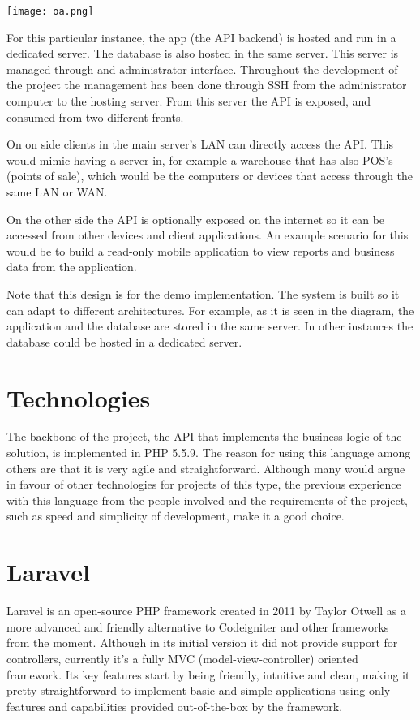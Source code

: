 \texttt{[image: oa.png]}

For this particular instance, the app (the API backend) is hosted and run in a dedicated server. The database is also hosted in the same server. This server is managed through and administrator interface. Throughout the development of the project the management has been done through SSH from the administrator computer to the hosting server. From this server the API is exposed, and consumed from two different fronts. 

On on side clients in the main server’s LAN can directly access the API. This would mimic having a server in, for example a warehouse that has also POS’s (points of sale), which would be the computers or devices that access through the same LAN or WAN.

On the other side the API is optionally exposed on the internet so it can be accessed from other devices and client applications. An example scenario for this would be to build a read-only mobile application to view reports and business data from the application.

Note that this design is for the demo implementation. The system is built so it can adapt to different architectures. For example, as it is seen in the diagram, the application and the database are stored in the same server. In other instances the database could be hosted in a dedicated server.

\section{Technologies}
The backbone of the project, the API that implements the business logic of the solution, is implemented in PHP 5.5.9. The reason for using this language among others are that it is very agile and straightforward. Although many would argue in favour of other technologies for projects of this type, the previous experience with this language from the people involved and the requirements of the project, such as speed and simplicity of development, make it a good choice.

\section{Laravel}
Laravel is an open-source PHP framework created in 2011 by Taylor Otwell as a more advanced and friendly alternative to Codeigniter and other frameworks from the moment. Although in its initial version it did not provide support for controllers, currently it’s a fully MVC (model-view-controller) oriented framework. Its key features start by being friendly, intuitive and clean, making it pretty straightforward to implement basic and simple applications using only features and capabilities provided out-of-the-box by the framework.

